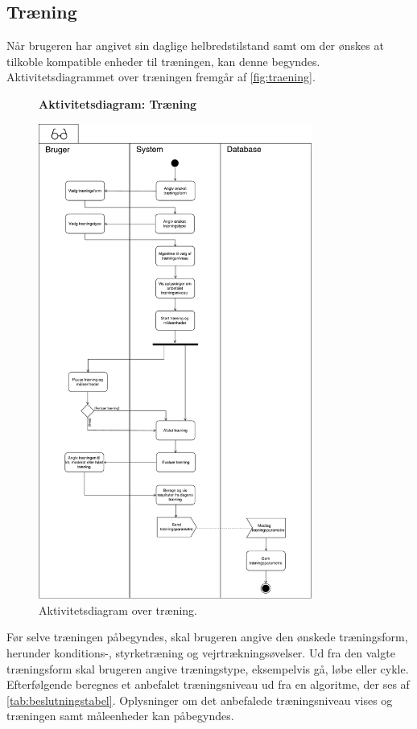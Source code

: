 \subsection*{Træning} \label{sec:traening}
Når brugeren har angivet sin daglige helbredstilstand samt om der ønskes at tilkoble kompatible enheder til træningen, kan denne begyndes. Aktivitetsdiagrammet over træningen fremgår af \autoref{fig:traening}. 

\begin{figure} [H]
\centering
\textbf{Aktivitetsdiagram: Træning}\par\medskip
\includegraphics[width=0.8\textwidth]{figures/aktivitetsdiagram/NYTraening}
\caption{Aktivitetsdiagram over træning.}
\label{fig:traening}
\end{figure}

\noindent
Før selve træningen påbegyndes, skal brugeren angive den ønskede træningsform, herunder konditions-, styrketræning og vejrtrækningsøvelser. Ud fra den valgte træningsform skal brugeren angive træningstype, eksempelvis gå, løbe eller cykle. Efterfølgende beregnes et anbefalet træningsniveau ud fra en algoritme, der ses af \autoref{tab:beslutningstabel}. Oplysninger om det anbefalede træningsniveau vises og træningen samt måleenheder kan påbegyndes. 

